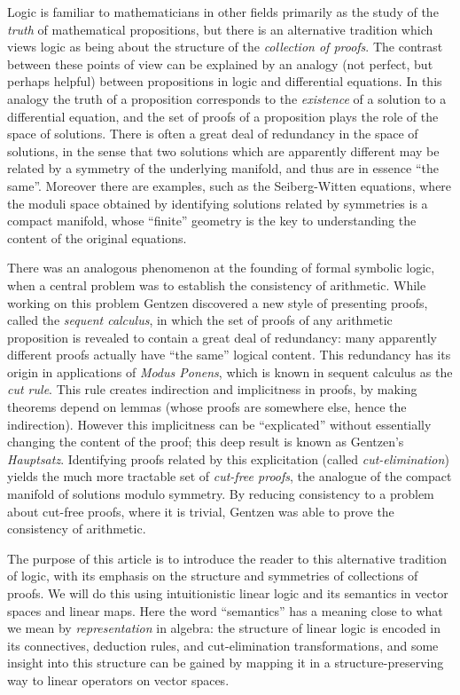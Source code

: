 \documentclass[english,letter paper,12pt,reqno]{article}
\theoremstyle{example}
\numberwithin{equation}{section}
\begin{document}
Logic is familiar to mathematicians in other fields primarily as the study of the \emph{truth} of mathematical propositions, but there is an alternative tradition which views logic as being about the structure of the \emph{collection of proofs}. The contrast between these points of view can be explained by an analogy (not perfect, but perhaps helpful) between propositions in logic and differential equations. In this analogy the truth of a proposition corresponds to the \emph{existence} of a solution to a differential equation, and the set of proofs of a proposition plays the role of the space of solutions. There is often a great deal of redundancy in the space of solutions, in the sense that two solutions which are apparently different may be related by a symmetry of the underlying manifold, and thus are in essence ``the same''. Moreover there are examples, such as the Seiberg-Witten equations, where the moduli space obtained by identifying solutions related by symmetries is a compact manifold, whose ``finite'' geometry is the key to understanding the content of the original equations.

There was an analogous phenomenon at the founding of formal symbolic logic, when a central problem was to establish the consistency of arithmetic. While working on this problem Gentzen discovered a new style of presenting proofs, called the \emph{sequent calculus}, in which the set of proofs of any arithmetic proposition is revealed to contain a great deal of redundancy: many apparently different proofs actually have ``the same'' logical content. This redundancy has its origin in applications of \emph{Modus Ponens}, which is known in sequent calculus as the \emph{cut rule}. This rule creates indirection and implicitness in proofs, by making theorems depend on lemmas (whose proofs are somewhere else, hence the indirection). However this implicitness can be ``explicated'' without essentially changing the content of the proof; this deep result is known as Gentzen's \emph{Hauptsatz}. Identifying proofs related by this explicitation (called \emph{cut-elimination}) yields the much more tractable set of \emph{cut-free proofs}, the analogue of the compact manifold of solutions modulo symmetry. By reducing consistency to a problem about cut-free proofs, where it is trivial, Gentzen was able to prove the consistency of arithmetic.

\vspace{0.3cm}

The purpose of this article is to introduce the reader to this alternative tradition of logic, with its emphasis on the structure and symmetries of collections of proofs. We will do this using intuitionistic linear logic and its semantics in vector spaces and linear maps. Here the word ``semantics'' has a meaning close to what we mean by \emph{representation} in algebra: the structure of linear logic is encoded in its connectives, deduction rules, and cut-elimination transformations, and some insight into this structure can be gained by mapping it in a structure-preserving way to linear operators on vector spaces.
\end{document}
